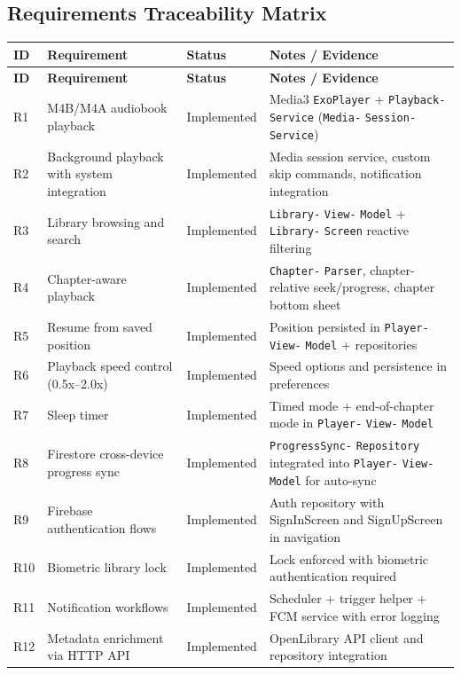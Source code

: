\documentclass[11pt,a4paper]{article}
\begin{document}
\subsection{Requirements Traceability Matrix}

{\footnotesize
\begin{longtable}{|p{0.8cm}|>{\RaggedRight}p{4.5cm}|>{\RaggedRight}p{2.5cm}|>{\RaggedRight}p{5.5cm}|}
\hline
\textbf{ID} & \textbf{Requirement} & \textbf{Status} & \textbf{Notes / Evidence} \\ \hline
\endfirsthead
\hline
\textbf{ID} & \textbf{Requirement} & \textbf{Status} & \textbf{Notes / Evidence} \\ \hline
\endhead
R1 & M4B/M4A audiobook playback & Implemented & Media3 \texttt{ExoPlayer} + \texttt{Playback-} \texttt{Service} (\texttt{Media-} \texttt{Session-} \texttt{Service}) \\ \hline
R2 & Background playback with system integration & Implemented & Media session service, custom skip commands, notification integration \\ \hline
R3 & Library browsing and search & Implemented & \texttt{Library-} \texttt{View-} \texttt{Model} + \texttt{Library-} \texttt{Screen} reactive filtering \\ \hline
R4 & Chapter-aware playback & Implemented & \texttt{Chapter-} \texttt{Parser}, chapter-relative seek/progress, chapter bottom sheet \\ \hline
R5 & Resume from saved position & Implemented & Position persisted in \texttt{Player-} \texttt{View-} \texttt{Model} + repositories \\ \hline
R6 & Playback speed control (0.5x--2.0x) & Implemented & Speed options and persistence in preferences \\ \hline
R7 & Sleep timer & Implemented & Timed mode + end-of-chapter mode in \texttt{Player-} \texttt{View-} \texttt{Model} \\ \hline
R8 & Firestore cross-device progress sync & Implemented & \texttt{ProgressSync-} \texttt{Repository} integrated into \texttt{Player-} \texttt{View-} \texttt{Model} for auto-sync \\ \hline
R9 & Firebase authentication flows & Implemented & Auth repository with SignInScreen and SignUpScreen in navigation \\ \hline
R10 & Biometric library lock & Implemented & Lock enforced with biometric authentication required \\ \hline
R11 & Notification workflows & Implemented & Scheduler + trigger helper + FCM service with error logging \\ \hline
R12 & Metadata enrichment via HTTP API & Implemented & OpenLibrary API client and repository integration \\ \hline
\end{longtable}
}
\end{document}
